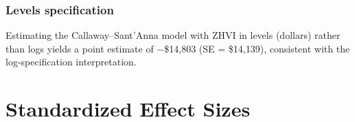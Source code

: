 \documentclass[12pt]{article}
\begin{document}
\subsubsection*{Levels specification} Estimating the Callaway--Sant'Anna model with ZHVI in levels (dollars) rather than logs yields a point estimate of $-$\$14{,}803 (SE = \$14{,}139), consistent with the log-specification interpretation.

\section{Standardized Effect Sizes}
\label{sec:sde}


\end{document}
